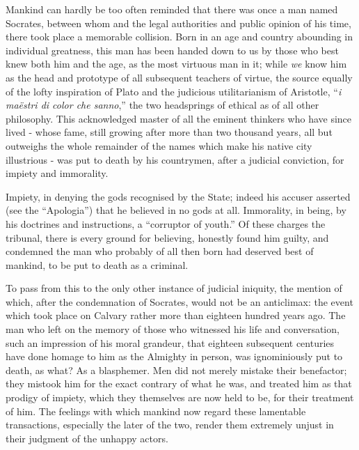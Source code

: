 Mankind can hardly be too often reminded that there was once a man named Socrates, between whom and the legal authorities and public opinion of his time, there took place a memorable collision. Born in an age and country abounding in individual greatness, this man has been handed down to us by those who best knew both him and the age, as the most virtuous man in it; while \textit{we} know him as the head and prototype of all subsequent teachers of virtue, the source equally of the lofty inspiration of Plato and the judicious utilitarianism of Aristotle, “\textit{i maëstri di color che sanno},” the two headsprings of ethical as of all other philosophy. This acknowledged master of all the eminent thinkers who have since lived - whose fame, still growing after more than two thousand years, all but outweighs the whole remainder of the names which make his native city illustrious - was put to death by his countrymen, after a judicial conviction, for impiety and immorality.\par

Impiety, in denying the gods recognised by the State; indeed his accuser asserted (see the “Apologia”) that he believed in no gods at all. Immorality, in being, by his doctrines and instructions, a “corruptor of youth.” Of these charges the tribunal, there is every ground for believing, honestly found him guilty, and condemned the man who probably of all then born had deserved best of mankind, to be put to death as a criminal.\par

To pass from this to the only other instance of judicial iniquity, the mention of which, after the condemnation of Socrates, would not be an anticlimax: the event which took place on Calvary rather more than eighteen hundred years ago. The man who left on the memory of those who witnessed his life and conversation, such an impression of his moral grandeur, that eighteen subsequent centuries have done homage to him as the Almighty in person, was ignominiously put to death, as what? As a blasphemer. Men did not merely mistake their benefactor; they mistook him for the exact contrary of what he was, and treated him as that prodigy of impiety, which they themselves are now held to be, for their treatment of him. The feelings with which mankind now regard these lamentable transactions, especially the later of the two, render them extremely unjust in their judgment of the unhappy actors.\par

